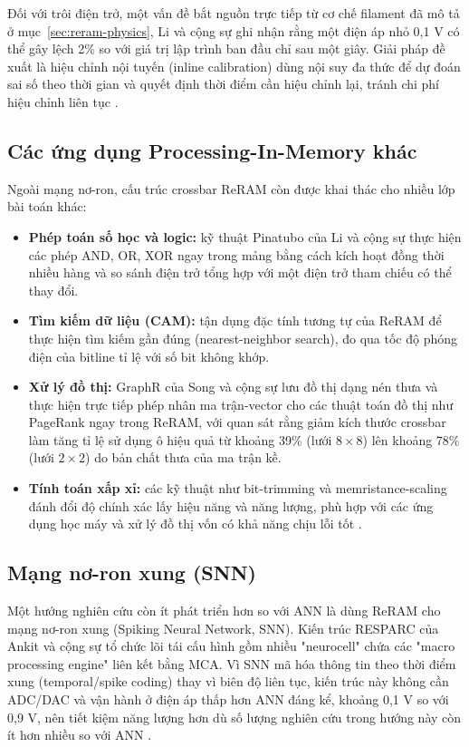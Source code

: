 \documentclass[12pt,a4paper]{article}
\begin{document}
Đối với trôi điện trở, một vấn đề bắt nguồn trực tiếp từ cơ chế filament đã mô tả ở mục~\ref{sec:reram-physics}, Li và cộng sự ghi nhận rằng một điện áp nhỏ 0,1 V có thể gây lệch 2\% so với giá trị lập trình ban đầu chỉ sau một giây. Giải pháp đề xuất là hiệu chỉnh nội tuyến (inline calibration) dùng nội suy đa thức để dự đoán sai số theo thời gian và quyết định thời điểm cần hiệu chỉnh lại, tránh chi phí hiệu chỉnh liên tục \cite{mittal2019}.

\subsection{Các ứng dụng Processing-In-Memory khác}

Ngoài mạng nơ-ron, cấu trúc crossbar ReRAM còn được khai thác cho nhiều lớp bài toán khác:

\begin{itemize}[leftmargin=1.5em]
    \item \textbf{Phép toán số học và logic:} kỹ thuật Pinatubo của Li và cộng sự thực hiện các phép AND, OR, XOR ngay trong mảng bằng cách kích hoạt đồng thời nhiều hàng và so sánh điện trở tổng hợp với một điện trở tham chiếu có thể thay đổi.
    \item \textbf{Tìm kiếm dữ liệu (CAM):} tận dụng đặc tính tương tự của ReRAM để thực hiện tìm kiếm gần đúng (nearest-neighbor search), đo qua tốc độ phóng điện của bitline tỉ lệ với số bit không khớp.
    \item \textbf{Xử lý đồ thị:} GraphR của Song và cộng sự lưu đồ thị dạng nén thưa và thực hiện trực tiếp phép nhân ma trận-vector cho các thuật toán đồ thị như PageRank ngay trong ReRAM, với quan sát rằng giảm kích thước crossbar làm tăng tỉ lệ sử dụng ô hiệu quả từ khoảng 39\% (lưới $8\times8$) lên khoảng 78\% (lưới $2\times2$) do bản chất thưa của ma trận kề.
    \item \textbf{Tính toán xấp xỉ:} các kỹ thuật như bit-trimming và memristance-scaling đánh đổi độ chính xác lấy hiệu năng và năng lượng, phù hợp với các ứng dụng học máy và xử lý đồ thị vốn có khả năng chịu lỗi tốt \cite{mittal2019}.
\end{itemize}

\subsection{Mạng nơ-ron xung (SNN)}

Một hướng nghiên cứu còn ít phát triển hơn so với ANN là dùng ReRAM cho mạng nơ-ron xung (Spiking Neural Network, SNN). Kiến trúc RESPARC của Ankit và cộng sự tổ chức lõi tái cấu hình gồm nhiều "neurocell" chứa các "macro processing engine" liên kết bằng MCA. Vì SNN mã hóa thông tin theo thời điểm xung (temporal/spike coding) thay vì biên độ liên tục, kiến trúc này không cần ADC/DAC và vận hành ở điện áp thấp hơn ANN đáng kể, khoảng 0,1 V so với 0,9 V, nên tiết kiệm năng lượng hơn dù số lượng nghiên cứu trong hướng này còn ít hơn nhiều so với ANN \cite{mittal2019}.
\end{document}
